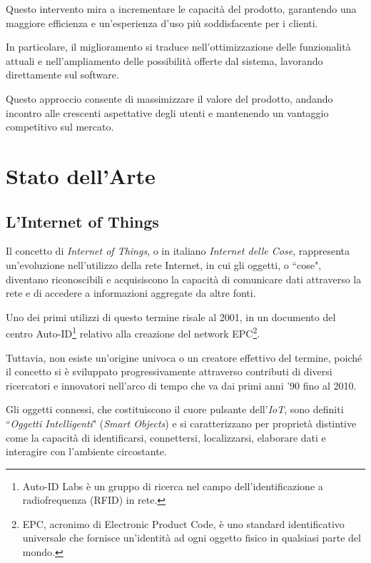 \documentclass[12pt,a4paper,openright,twoside]{book}
\begin{document}
            Questo intervento mira a incrementare le capacità del prodotto, garantendo una maggiore efficienza e un’esperienza d’uso più soddisfacente per i clienti.

            In particolare, il miglioramento si traduce nell’ottimizzazione delle funzionalità attuali e nell’ampliamento delle possibilità offerte dal sistema, lavorando direttamente sul software.

            Questo approccio consente di massimizzare il valore del prodotto, andando incontro alle crescenti aspettative degli utenti e mantenendo un vantaggio competitivo sul mercato.

\chapter{Stato dell'Arte}

    \section{L'Internet of Things}

        Il concetto di \textit{Internet of Things}, o in italiano \textit{Internet delle Cose}, rappresenta un'evoluzione nell'utilizzo della rete Internet, in cui gli oggetti, o ``cose", diventano riconoscibili e acquisiscono la capacità di comunicare dati attraverso la rete e di accedere a informazioni aggregate da altre fonti.

        Uno dei primi utilizzi di questo termine risale al 2001, in un documento del centro Auto-ID\footnote{Auto-ID Labs è un gruppo di ricerca nel campo dell'identificazione a radiofrequenza (RFID) in rete.
        } relativo alla creazione del network EPC\footnote{EPC, acronimo di Electronic Product Code, è uno standard identificativo universale che fornisce un'identità ad ogni oggetto fisico in qualsiasi parte del mondo.}.

        Tuttavia, non esiste un'origine univoca o un creatore effettivo del termine, poiché il concetto si è sviluppato progressivamente attraverso contributi di diversi ricercatori e innovatori nell'arco di tempo che va dai primi anni '90 fino al 2010.

        Gli oggetti connessi, che costituiscono il cuore pulsante dell’\textit{IoT}, sono definiti ``\textit{Oggetti Intelligenti}" (\textit{Smart Objects}) e si caratterizzano per proprietà distintive come la capacità di identificarsi, connettersi, localizzarsi, elaborare dati e interagire con l'ambiente circostante.
\end{document}
